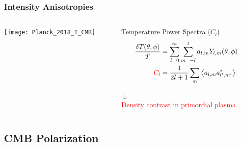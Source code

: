 \documentclass[10pt,aspectratio=169]{beamer}
\begin{document}
\begin{frame}
\frametitle{Intensity Anisotropies}

\begin{columns}
        \begin{column}{0.65\textwidth}
                \centering
                \texttt{[image: Planck\_2018\_T\_CMB]}
        \end{column}
        \pause
        \begin{column}{0.33\textwidth}
        \scriptsize
                \begin{block}{Temperature Power Spectra ($C_l$)}
                        \scriptsize
                        \begin{align}
                                \frac{\var{T\qty(\theta,\phi)}}{\bar T} & =
                                \sum^\infty_{l=0}\sum^l_{m=-l} a_{l,m}
                                Y_{l,m}\qty(\theta,\phi) \\
                                \textcolor{red}{C_l} & = \frac{1}{2l + 1}
                                \sum_m \expval{a_{l,m} a^*_{l',m'}}
                        \end{align}
                \end{block}
                \pause
                \centering
                \Large $\downarrow$\\
                \normalsize
                \textcolor{red}{Density contrast in primordial plasma}
        \end{column}
\end{columns}

\end{frame}

\subsection{CMB Polarization}
\end{document}

